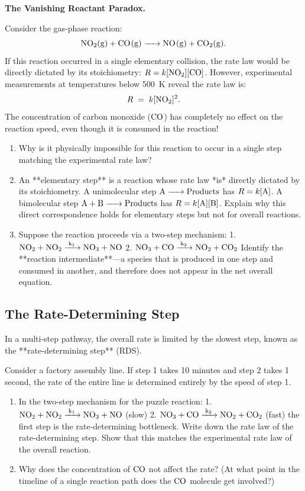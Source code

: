\documentclass[12pt, a4paper]{book}
\begin{document}
\begin{puzzlebox}
\textbf{The Vanishing Reactant Paradox.}

Consider the gas-phase reaction:
\[
  \ce{NO2(g) + CO(g) -> NO(g) + CO2(g)}.
\]
If this reaction occurred in a single elementary collision, the rate law would be directly dictated by its stoichiometry: $R = k[\ce{NO2}][\ce{CO}]$.
However, experimental measurements at temperatures below \SI{500}{K} reveal the rate law is:
\[
  R \;=\; k [\ce{NO2}]^2.
\]
The concentration of carbon monoxide ($\ce{CO}$) has completely no effect on the reaction speed, even though it is consumed in the reaction!
\begin{enumerate}[label=(\alph*), leftmargin=*]
  \item Why is it physically impossible for this reaction to occur in a single step matching the experimental rate law?
  \item An **elementary step** is a reaction whose rate law *is* directly dictated by its stoichiometry.
        A unimolecular step $\ce{A -> Products}$ has $R = k[\ce{A}]$. A bimolecular step $\ce{A + B -> Products}$ has $R = k[\ce{A}][\ce{B}]$.
        Explain why this direct correspondence holds for elementary steps but not for overall reactions.
  \item Suppose the reaction proceeds via a two-step mechanism:
        1. $\ce{NO2 + NO2 ->[k_1] NO3 + NO}$
        2. $\ce{NO3 + CO ->[k_2] NO2 + CO2}$
        Identify the **reaction intermediate**—a species that is produced in one step and consumed in another, and therefore does not appear in the net overall equation.
\end{enumerate}
\end{puzzlebox}

\subsection{The Rate-Determining Step}

In a multi-step pathway, the overall rate is limited by the slowest step, known as the **rate-determining step** (RDS).

\begin{explobox}
Consider a factory assembly line. If step 1 takes 10 minutes and step 2 takes 1 second, the rate of the entire line is determined entirely by the speed of step 1.
\begin{enumerate}[label=(\alph*), leftmargin=*]
  \item In the two-step mechanism for the puzzle reaction:
        1. $\ce{NO2 + NO2 ->[k_1] NO3 + NO}$ (slow)
        2. $\ce{NO3 + CO ->[k_2] NO2 + CO2}$ (fast)
        the first step is the rate-determining bottleneck.
        Write down the rate law of the rate-determining step. Show that this matches the experimental rate law of the overall reaction.
  \item Why does the concentration of $\ce{CO}$ not affect the rate? (At what point in the timeline of a single reaction path does the $\ce{CO}$ molecule get involved?)
\end{enumerate}
\end{explobox}
\end{document}
